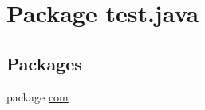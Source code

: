 \hypertarget{namespacetest_1_1java}{\section{Package test.\-java}
\label{namespacetest_1_1java}
}
\subsection*{Packages}
\begin{DoxyCompactItemize}
\item 
package \hyperlink{namespacetest_1_1java_1_1com}{com}
\end{DoxyCompactItemize}
